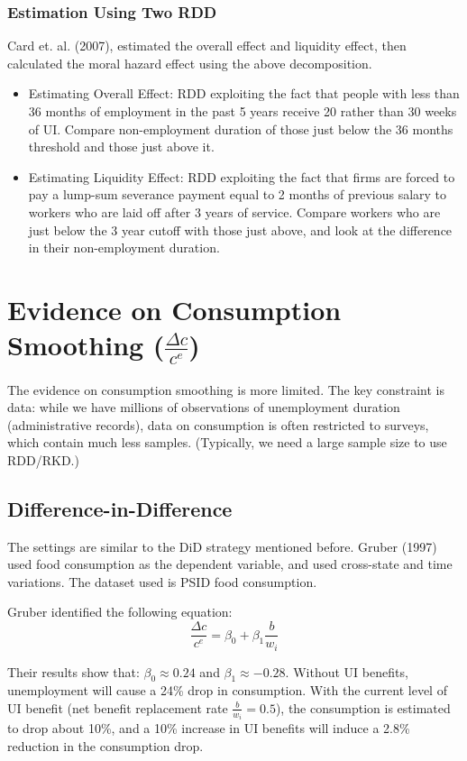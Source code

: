             \subsubsection{Estimation Using Two RDD}
                Card et. al. (2007), estimated the overall effect and liquidity effect, then calculated the moral hazard effect using the above decomposition.
                \begin{itemize}
                    \item Estimating Overall Effect: RDD exploiting the fact that people with less than 36 months of employment in the past 5 years receive 20 rather than 30 weeks of UI. Compare non-employment duration of those just below the 36 months threshold and those just above it.
                    \item Estimating Liquidity Effect: RDD exploiting the fact that firms are forced to pay a lump-sum severance payment equal to 2 months of previous salary to workers who are laid off after 3 years of service. Compare workers who are just below the 3 year cutoff with those just above, and look at the difference in their non-employment duration.
                \end{itemize}
        
\section{Evidence on Consumption Smoothing ($\frac{\Delta c}{c^e}$)}
    The evidence on consumption smoothing is more limited. The key constraint is data: while we have millions of observations of unemployment duration (administrative records), data on consumption is often restricted to surveys, which contain much less samples. (Typically, we need a large sample size to use RDD/RKD.)
    
    \subsection{Difference-in-Difference}
        The settings are similar to the DiD strategy mentioned before. Gruber (1997) used food consumption as the dependent variable, and used cross-state and time variations. The dataset used is PSID food consumption.
        
        Gruber identified the following equation:
        $$\frac{\Delta c}{c^e} = \beta_0 + \beta_1 \frac{b}{w_i}$$
        
        Their results show that: $\beta_0 \approx 0.24$ and $\beta_1 \approx -0.28$. Without UI benefits, unemployment will cause a 24\% drop in consumption. With the current level of UI benefit (net benefit replacement rate $\frac{b}{w_i}=0.5$), the consumption is estimated to drop about 10\%, and a 10\% increase in UI benefits will induce a 2.8\% reduction in the consumption drop.
        
